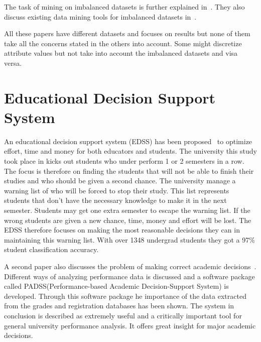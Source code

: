 \bigskip\noindent
The task of mining on imbalanced datasets is further explained in~\cite{10}.
They also discuss existing data mining tools for imbalanced datasets in~\cite{8}.

\bigskip\noindent
All these papers have different datasets and focuses on results but none of them take all the concerns stated in the others into account. 
Some might discretize attribute values but not take into account the imbalanced datasets and visa versa.

\section{Educational Decision Support System}
An educational decision support system (EDSS) has been proposed~\cite{5} to optimize effort, time and money for both educators and students. 
The university this study took place in kicks out students who under perform 1 or 2 semesters in a row.
The focus is therefore on finding the students that will not be able to finish their studies and who should be given a second chance. 
The university manage a warning list of who will be forced to stop their study. 
This list represents students that don't have the necessary knowledge to make it in the next semester. 
Students may get one extra semester to escape the warning list. 
If the wrong students are given a new chance, time, money and effort will be lost. 
The EDSS therefore focuses on making the most reasonable decisions they can in maintaining this warning list. 
With over 1348 undergrad students they got a 97\% student classification accuracy.

\bigskip\noindent
A second paper also discusses the problem of making correct academic decisions~\cite{6}. 
Different ways of analyzing performance data is discussed and a software package called PADSS(Performance-based Academic Decision-Support System) is developed. 
Through this software package he importance of the data extracted from the grades and registration databases has been shown. 
The system in conclusion is described as extremely useful and a critically important tool for general university performance analysis.
It offers great insight for major academic decisions.
